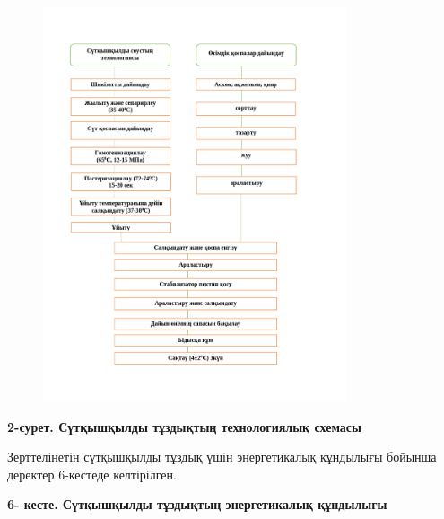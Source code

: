 {\begin{figure}[H]
	\centering
	\includegraphics[width=0.8\textwidth]{media/pish2/image25}
	\caption*{}
\end{figure}


{\bfseries 2-сурет. Сүтқышқылды тұздықтың технологиялық схемасы}

Зерттелінетін сүтқышқылды тұздық үшін энергетикалық құндылығы бойынша
деректер 6-кестеде келтірілген.

{\bfseries 6- кесте. Сүтқышқылды тұздықтың энергетикалық құндылығы}

}
